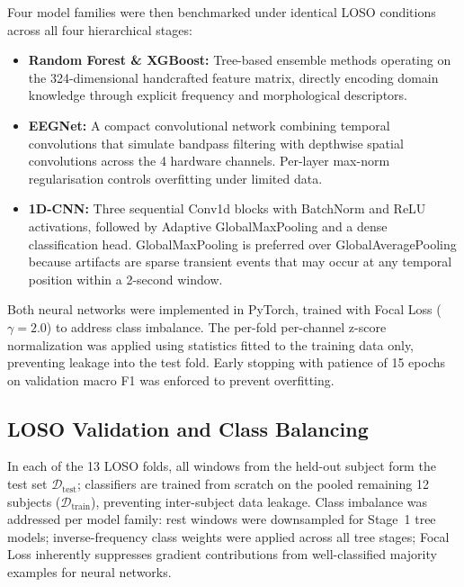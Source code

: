 \documentclass[11pt,a4paper]{article}
\begin{document}
Four model families were then benchmarked under identical LOSO conditions across all four hierarchical stages:

\begin{itemize}
    \item \textbf{Random Forest \& XGBoost:} Tree-based ensemble methods operating on the 324-dimensional handcrafted feature matrix, directly encoding domain knowledge through explicit frequency and morphological descriptors.

    \item \textbf{EEGNet:} A compact convolutional network combining temporal convolutions that simulate bandpass filtering with depthwise spatial convolutions across the 4 hardware channels. Per-layer max-norm regularisation controls overfitting under limited data.

    \item \textbf{1D-CNN:} Three sequential Conv1d blocks with BatchNorm and ReLU activations, followed by Adaptive GlobalMaxPooling and a dense classification head. GlobalMaxPooling is preferred over GlobalAveragePooling because artifacts are sparse transient events that may occur at any temporal position within a 2-second window.
\end{itemize}

Both neural networks were implemented in PyTorch, trained with Focal Loss ($\gamma = 2.0$) to address class imbalance. The per-fold per-channel z-score normalization was applied using statistics fitted to the training data only, preventing leakage into the test fold. Early stopping with patience of 15 epochs on validation macro F1 was enforced to prevent overfitting.


\subsection{LOSO Validation and Class Balancing}
In each of the 13 LOSO folds, all windows from the held-out subject form the test set $\mathcal{D}_{\text{test}}$; classifiers are trained from scratch on the pooled remaining 12 subjects ($\mathcal{D}_{\text{train}}$), preventing inter-subject data leakage. Class imbalance was addressed per model family: rest windows were downsampled for Stage~1 tree models; inverse-frequency class weights were applied across all tree stages; Focal Loss inherently suppresses gradient contributions from well-classified majority examples for neural networks.
\end{document}
